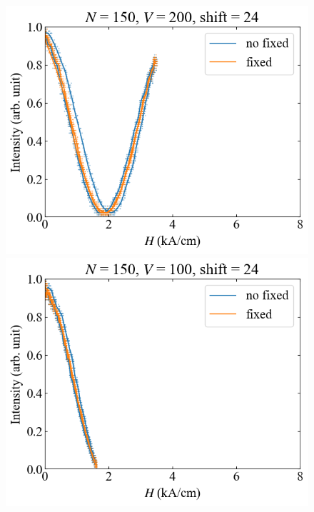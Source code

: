 \documentclass[9pt,dvipdfmx,a4paper]{jsarticle}
\begin{document}
\begin{figure}[H]
\begin{minipage}[t]{0.24\columnwidth}
    \end{minipage}
    \hfill
    \begin{minipage}[t]{0.24\columnwidth}
        \centering
        \includegraphics[width = \columnwidth]{xy/03.png}
    \end{minipage}
    \hfill
    \begin{minipage}[t]{0.24\columnwidth}
        \centering
        \includegraphics[width = \columnwidth]{xy/04.png}
    \end{minipage}
\end{figure}
\end{document}

